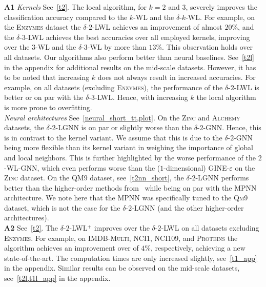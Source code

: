 \documentclass{article}
\newcommand{\xhdr}[1]{{\noindent\bfseries #1}}
\theoremstyle{definition}
\newcommand{\kwl}{$k$-\textsf{WL}\xspace}
\newcommand{\deltakwl}{$\delta$-$k$-\textsf{WL}\xspace}
\newcommand{\mpnn}{\textsf{MPNN}\xspace}
\newcommand{\gineeps}{\textsf{GINE-$\varepsilon$}\xspace}
\begin{document}
\xhdr{A1} \textit{Kernels} See~\cref{t2}. The local algorithm, for $k=2$  and $3$, severely improves the classification accuracy compared to the \kwl and the \deltakwl. For example, on the \textsc{Enzymes} dataset the $\delta$-$2$-\textsf{LWL} achieves an improvement of almost $20$\%, and the $\delta$-$3$-\textsf{LWL} achieves the best accuracies over all employed kernels, improving over the $3$-\textsf{WL} and the $\delta$-$3$-\textsf{WL} by more than $13$\%. This observation holds over all datasets. Our algorithms also perform better than neural baselines. See~\cref{t2l} in the appendix for additional results on the mid-scale datasets. However, it has to be noted that increasing $k$ does not always result in increased accuracies. For example, on all datasets (excluding \textsc{Enzymes}), the performance of the $\delta$-$2$-\textsf{LWL} is better or on par with the $\delta$-$3$-\textsf{LWL}. Hence, with increasing $k$ the local algorithm is more prone to overfitting.\\
\textit{Neural architectures} See~\cref{neural_short_tt,plot}. On the \textsc{Zinc} and \textsc{Alchemy} datasets, the $\delta$-$2$-\textsf{LGNN} is on par or slightly worse than the $\delta$-$2$-\textsf{GNN}. Hence, this is in contrast to the kernel variant. We assume that this is due to the  $\delta$-$2$-\textsf{GNN} being more flexible than its kernel variant in weighing the importance of global and local neighbors. This is further highlighted by the worse performance of the $2$-\textsf{WL-GNN}, which even performs worse than the ($1$-dimensional) \gineeps on the \textsc{Zinc} dataset. On the \textsc{QM9} dataset, see~\cref{t2nn_short}, the $\delta$-$2$-\textsf{LGNN} performs better than the higher-order methods from~\cite{Mar+2019,Mor+2019} while being on par with the \mpnn architecture. We note here that the \mpnn was specifically tuned to the \textsc{Qm9} dataset, which is not the case for the $\delta$-$2$-\textsf{LGNN} (and the other higher-order architectures).\\
\xhdr{A2} See~\cref{t2}. The $\delta$-$2$-\textsf{LWL}$^+$ improves over the $\delta$-$2$-\textsf{LWL} on all datasets excluding \textsc{Enzymes}. For example, on \textsc{IMDB-Multi}, \textsc{NCI1}, \textsc{NCI109}, and \textsc{Proteins} the algorithm achieves an improvement over of $4\%$, respectively, achieving a new state-of-the-art. The computation times are only increased slightly, see~\cref{t1_app} in the appendix. Similar results can be observed on the mid-scale datasets, see~\cref{t2l,t1l_app} in the appendix.\\
\end{document}
